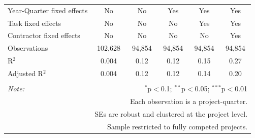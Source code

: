 \documentclass[
]{article}
\begin{document}
\begin{table}[H]
\begin{tabular}{@{\extracolsep{-2pt}}lccccc}
Year-Quarter fixed effects & No & No & Yes & Yes & Yes \\ 
Task fixed effects & No & No & No & Yes & Yes \\ 
Contractor fixed effects & No & No & No & No & Yes \\ 
Observations & 102,628 & 94,854 & 94,854 & 94,854 & 94,854 \\ 
R$^{2}$ & 0.004 & 0.12 & 0.12 & 0.15 & 0.27 \\ 
Adjusted R$^{2}$ & 0.004 & 0.12 & 0.12 & 0.14 & 0.20 \\ 
\hline 
\hline \\[-1.8ex] 
\textit{Note:}  & \multicolumn{5}{r}{$^{*}$p$<$0.1; $^{**}$p$<$0.05; $^{***}$p$<$0.01} \\ 
 & \multicolumn{5}{r}{Each observation is a project-quarter.} \\ 
 & \multicolumn{5}{r}{SEs are robust and clustered at the project level.} \\ 
 & \multicolumn{5}{r}{Sample restricted to fully competed projects.} \\ 
\end{tabular} 
\end{table}
\end{document}

